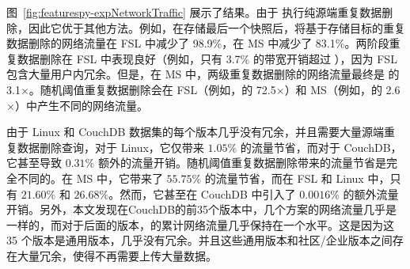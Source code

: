 图~\ref{fig:featurespy-expNetworkTraffic} 展示了结果。由于 \prototype 执行纯源端重复数据删除，因此它优于其他方法。例如，在存储最后一个快照后，\prototype 将基于存储目标的重复数据删除的网络流量在 FSL 中减少了 98.9\%，在 MS 中减少了 83.1\%。两阶段重复数据删除在 ​​FSL 中表现良好（例如，只有 3.7\% 的带宽开销超过 \prototype），因为 FSL 包含大量用户内冗余。但是，在 MS 中，两级重复数据删除的网络流量最终是 \prototype 的 3.1$\times$。随机阈值重复数据删除会在 FSL（例如，\prototype 的 72.5$\times$）和 MS（例如，\prototype 的 2.6$\times$）中产生不同的网络流量。

由于 Linux 和 CouchDB 数据集的每个版本几乎没有冗余，并且需要大量源端重复数据删除查询，对于 Linux，它仅带来 $1.05\%$ 的流量节省，而对于 CouchDB，它甚至导致 $0.31 \%$ 额外的流量开销。随机阈值重复数据删除带来的流量节省是完全不同的。在 MS 中，它带来了 $55.75\%$ 的流量节省，而在 FSL 和 Linux 中，只有 $21.60\%$ 和 $26.68\%$。然而，它甚至在 CouchDB 中引入了 $0.0016\%$ 的额外流量开销。另外，本文发现在CouchDB的前35个版本中，几个方案的网络流量几乎是一样的，而对于后面的版本，\prototype 的累计网络流量几乎保持在一个水平。这是因为这 35 个版本是通用版本，几乎没有冗余。并且这些通用版本和社区/企业版本之间存在大量冗余，使得\prototype 不再需要上传大量数据。